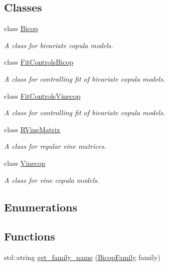 \subsection*{Classes}
\begin{DoxyCompactItemize}
\item 
class \hyperlink{classvinecopulib_1_1_bicop}{Bicop}
\begin{DoxyCompactList}\small\item\em A class for bivariate copula models. \end{DoxyCompactList}\item 
class \hyperlink{classvinecopulib_1_1_fit_controls_bicop}{Fit\+Controls\+Bicop}
\begin{DoxyCompactList}\small\item\em A class for controlling fit of bivariate copula models. \end{DoxyCompactList}\item 
class \hyperlink{classvinecopulib_1_1_fit_controls_vinecop}{Fit\+Controls\+Vinecop}
\begin{DoxyCompactList}\small\item\em A class for controlling fit of bivariate copula models. \end{DoxyCompactList}\item 
class \hyperlink{classvinecopulib_1_1_r_vine_matrix}{R\+Vine\+Matrix}
\begin{DoxyCompactList}\small\item\em A class for regular vine matrices. \end{DoxyCompactList}\item 
class \hyperlink{classvinecopulib_1_1_vinecop}{Vinecop}
\begin{DoxyCompactList}\small\item\em A class for vine copula models. \end{DoxyCompactList}\end{DoxyCompactItemize}
\subsection*{Enumerations}
\subsection*{Functions}
\begin{DoxyCompactItemize}
\item 
std\+::string \hyperlink{namespacevinecopulib_ac46553ae5f99072f65e9d3254d2c526d}{get\+\_\+family\+\_\+name} (\hyperlink{namespacevinecopulib_a42e95cc06d33896199caab0c11ad44f3}{Bicop\+Family} family)
\end{DoxyCompactItemize}


